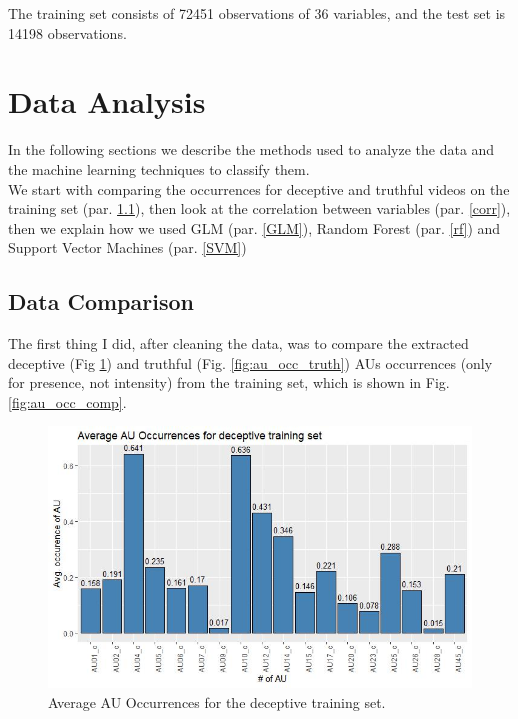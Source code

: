 The training set consists of 72451 observations of 36 variables, and the test set is 14198 observations.

\clearpage

\section{Data Analysis} \label{data_an}
In the following sections we describe the methods used to analyze the data and the machine learning techniques to classify them. \\
We start with comparing the occurrences for deceptive and truthful videos on the training set (par. \ref{data_comp}), then look at the correlation between variables (par. \ref{corr}), then we explain how we used GLM (par. \ref{GLM}), Random Forest (par. \ref{rf}) and Support Vector Machines (par. \ref{SVM})

\subsection{Data Comparison} \label{data_comp}
The first thing I did, after cleaning the data, was to compare the extracted deceptive (Fig \ref{fig:au_occ_dec}) and truthful (Fig. \ref{fig:au_occ_truth}) AUs occurrences (only for presence, not intensity) from the training set, which is shown in Fig. \ref{fig:au_occ_comp}.

\begin{figure}[H]
	\centering
	\includegraphics[width=1\textwidth]{images/au_occ_dec}
	\caption{Average AU Occurrences for the deceptive training set.}
	\label{fig:au_occ_dec}
\end{figure}

\clearpage

